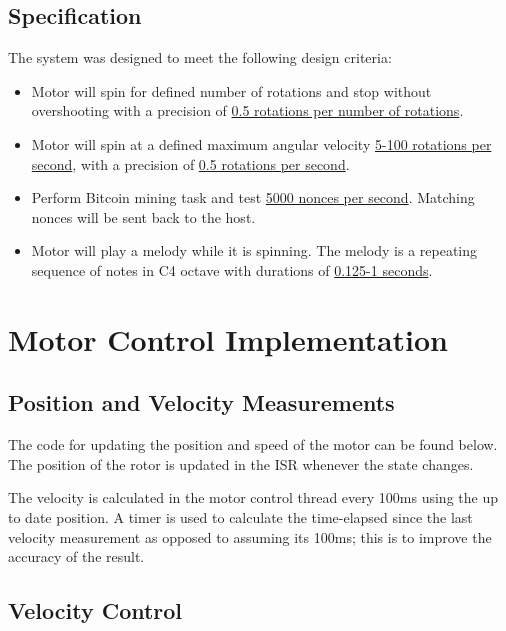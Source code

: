 \documentclass{article}
\begin{document}
\subsection{Specification}
\noindent The system was designed to meet the following design criteria:
 \begin{itemize}
	\item Motor will spin for defined number of rotations and stop without overshooting with a precision of \underline{0.5 rotations per number of rotations}.
	\item Motor will spin at a defined maximum angular velocity \underline{5-100 rotations per second}, with a precision of \underline{0.5 rotations per second}.
	\item Perform Bitcoin mining task and test \underline{5000 nonces per second}. Matching nonces will be sent back to the host.
	\item Motor will play a melody while it is spinning. The melody is a repeating sequence of notes in C4 octave with durations of \underline{0.125-1 seconds}.
\end{itemize}





\section{Motor Control Implementation}
\subsection{Position and Velocity Measurements}

\noindent
The code for updating the position and speed of the motor can be found below. The position of the rotor is updated in the ISR whenever the state changes.

\bigskip

\noindent
The velocity is calculated in the motor control thread every 100ms using the up to date position. A timer is used to calculate the time-elapsed since the last velocity measurement as opposed to assuming its 100ms; this is to improve the accuracy of the result.

\bigskip





\subsection{Velocity Control}
\end{document}
